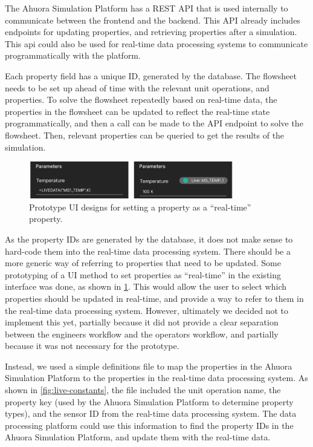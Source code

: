 \documentclass[12pt]{report}
\begin{document}
The Ahuora Simulation Platform has a REST API that is used internally to communicate between the frontend and the backend. This API already includes endpoints for updating properties, and retrieving properties after a simulation. This api could also be used for real-time data processing systems to communicate programmatically with the platform.


Each property field has a unique ID, generated by the database. The flowsheet needs to be set up ahead of time with the relevant unit operations, and properties. To solve the flowsheet repeatedly based on real-time data, the properties in the flowsheet can be updated to reflect the real-time state programmatically, and then a call can be made to the API endpoint to solve the flowsheet. Then, relevant properties can be queried to get the results of the simulation.

\begin{figure}
    \centering
    \includegraphics[width=0.8\textwidth]{property_ui.png}
    \caption{Prototype UI designs for setting a property as a ``real-time'' property.}
    \label{fig:property-ui}
\end{figure}

As the property IDs are generated by the database, it does not make sense to hard-code them into the real-time data processing system. There should be a more generic way of referring to properties that need to be updated. Some prototyping of a UI method to set properties as ``real-time'' in the existing interface was done, as shown in \cref{fig:property-ui}. This would allow the user to select which properties should be updated in real-time, and provide a way to refer to them in the real-time data processing system. However, ultimately we decided not to implement this yet, partially because it did not provide a clear separation between the engineers workflow and the operators workflow, and partially because it was not necessary for the prototype.

Instead, we used a simple definitions file to map the properties in the Ahuora Simulation Platform to the properties in the real-time data processing system. As shown in \cref{fig:live-constants}, the file included the unit operation name, the property key (used by the Ahuora Simulation Platform to determine property types), and the sensor ID from the real-time data processing system. The data processing platform could use this information to find the property IDs in the Ahuora Simulation Platform, and update them with the real-time data.
\end{document}
